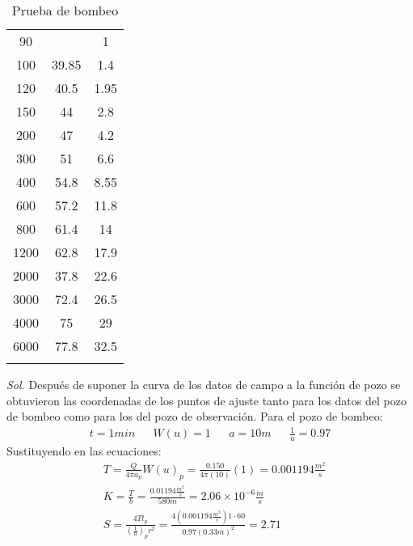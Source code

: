 \begin{example}
\begin{longtable}[c]{@{}ccc@{}}
        90           &                       & 1                     \\
        100          & 39.85                 & 1.4                   \\
        120          & 40.5                  & 1.95                  \\
        150          & 44                    & 2.8                   \\
        200          & 47                    & 4.2                   \\
        300          & 51                    & 6.6                   \\
        400          & 54.8                  & 8.55                  \\
        600          & 57.2                  & 11.8                  \\
        800          & 61.4                  & 14                    \\
        1200         & 62.8                  & 17.9                  \\
        2000         & 37.8                  & 22.6                  \\
        3000         & 72.4                  & 26.5                  \\
        4000         & 75                    & 29                    \\
        6000         & 77.8                  & 32.5                  \\* \bottomrule
        \caption{Prueba de bombeo}
        \label{tabgh11}\\
        \end{longtable}
\end{example}
\textit{ Sol. }
Después de suponer la curva de los datos de campo a la función de pozo se obtuvieron las coordenadas de los puntos de ajuste tanto para los datos del pozo de bombeo como para los del pozo de observación. Para el pozo de bombeo:
\begin{align*}
    t = 1min&& W(u) = 1 && a = 10m && \frac{1}{u} = 0.97
\end{align*}
Sustituyendo en las ecuaciones:
\begin{align*}
    &T = \frac{Q}{4\pi a_p } W(u)_p = \frac{0.150}{4 \pi (10)}(1) = 0.001194 \frac{m^2}{s}\\
    &K = \frac{T}{b} = \frac{0.01194 \frac{m^2}{s}}{580m}  = 2.06 \times 10^{ - 6} \frac{m}{s}\\
    &S = \frac{4Tt_p}{\left(\frac{1}{u}\right)_p r^2} = \frac{4\left(0.001194 \frac{m^2}{s}\right) 1 \cdot 60}{0.97 (0.33m)^2} = 2.71
\end{align*}
